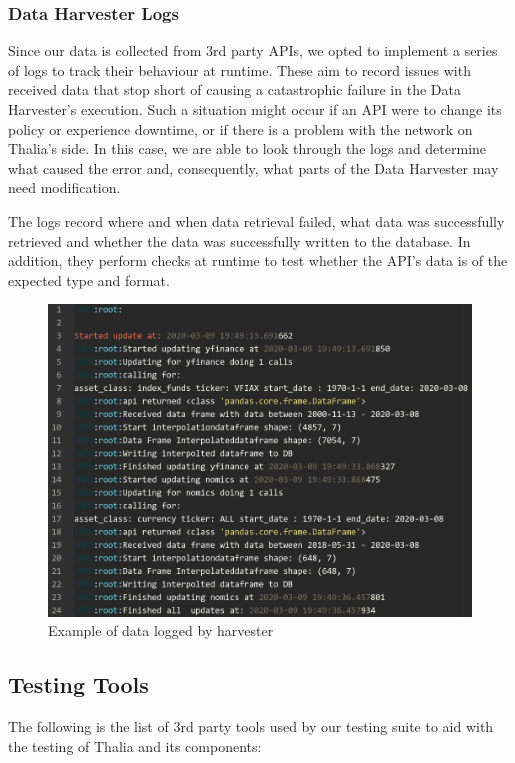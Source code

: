 \documentclass[main.tex]{subfiles}
\begin{document}
\subsubsection{Data Harvester Logs}
Since our data is collected from 3rd party APIs, we opted to implement a series of logs to track their behaviour at runtime. These aim to record issues with received data that stop short of causing a catastrophic failure in the Data Harvester's execution. Such a situation might occur if an API were to change its policy or experience downtime, or if there is a problem with the network on Thalia's side. In this case, we are able to look through the logs and determine what caused the error and, consequently, what parts of the Data Harvester may need modification.

The logs record where and when data retrieval failed, what data was successfully retrieved and whether the data was successfully written to the database. In addition, they perform checks at runtime to test whether the API's data is of the expected type and format.

\begin{figure}[H]
   \centering
   \includegraphics[scale=0.3]{07Testing/06Pictures/harversterLogEx.png}
   \caption{Example of data logged by harvester}
   \label{Example log}
\end{figure}

\subsection{Testing Tools}
The following is the list of 3rd party tools used by our testing suite to aid with the testing of Thalia and its components:
\end{document}
